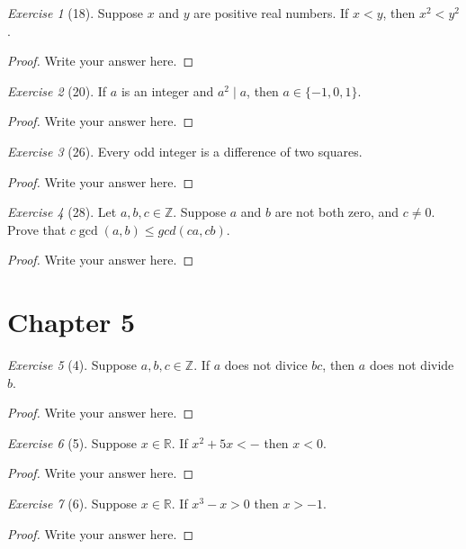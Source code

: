 \documentclass[12pt]{amsart}
\theoremstyle{remark}
\newtheorem*{exercise}{Exercise}%
\def\RR{\ensuremath{\mathbb R}}
\def\ZZ{\ensuremath{\mathbb Z}}
\theoremstyle{mycomment}
\begin{document}
\begin{exercise}[18] Suppose $x$ and $y$ are positive real numbers. If $x<y$, then $x^{2}<y^{2}$.
\begin{proof}
Write your answer here.
\end{proof}
\end{exercise}

\begin{exercise}[20] If $a$ is an integer and $a^{2}\mid a$, then $a\in\{-1,0,1\}$.
\begin{proof}
Write your answer here.
\end{proof}
\end{exercise}

\begin{exercise}[26] Every odd integer is a difference of two squares. 
\begin{proof}
Write your answer here.
\end{proof}
\end{exercise}

\begin{exercise}[28] Let $a,b,c\in\ZZ$. Suppose $a$ and $b$ are not both  zero, and $c\ne 0$. Prove that $c\gcd(a,b)\le gcd(ca,cb)$.
\begin{proof}
Write your answer here.
\end{proof}
\end{exercise}
\section*{Chapter 5}
\begin{exercise}[4] Suppose $a,b,c \in\ZZ$. If $a$ does not divice $bc$, then $a$ does not divide $b$.
\begin{proof}
Write your answer here.
\end{proof}
\end{exercise}

\begin{exercise}[5] Suppose $x\in\RR$. %
If $x^{2}+5x<-$ then $x<0$.
\begin{proof}
Write your answer here.
\end{proof}
\end{exercise}

\begin{exercise}[6] Suppose $x\in\RR$. If $x^{3}-x>0$ then $x>-1$.
\begin{proof}
Write your answer here.
\end{proof}
\end{exercise}
\end{document}
